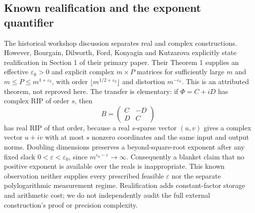 \documentclass[11pt]{article}
\begin{document}
\subsection{Known realification and the exponent quantifier}
The historical workshop discussion separates real and complex constructions. However, Bourgain, Dilworth, Ford, Konyagin and Kutzarova explicitly state realification in Section 1 of their primary paper. Their Theorem 1 supplies an effective $\varepsilon_0>0$ and explicit complex $m\times P$ matrices for sufficiently large $m$ and $m\le P\le m^{1+\varepsilon_0}$, with order $\lfloor m^{1/2+\varepsilon_0}\rfloor$ and distortion $m^{-\varepsilon_0}$. This is an attributed theorem, not reproved here. The transfer is elementary: if $\Phi=C+iD$ has complex RIP of order $s$, then
\[
B=\begin{pmatrix}C&-D\\D&C\end{pmatrix}
\]
has real RIP of that order, because a real $s$-sparse vector $(u,v)$ gives a complex vector $u+iv$ with at most $s$ nonzero coordinates and the same input and output norms. Doubling dimensions preserves a beyond-square-root exponent after any fixed slack $0<\varepsilon<\varepsilon_0$, since $m^{\varepsilon_0-\varepsilon}\to\infty$. Consequently a blanket claim that no positive exponent is available over the reals is inappropriate. This known observation neither supplies every prescribed feasible $\varepsilon$ nor the separate polylogarithmic measurement regime. Realification adds constant-factor storage and arithmetic cost; we do not independently audit the full external construction's proof or precision complexity.
\end{document}
